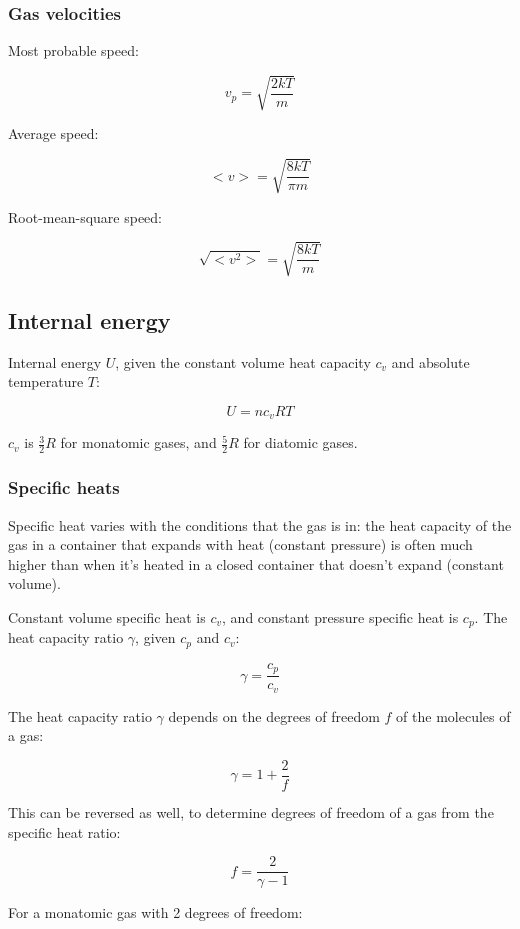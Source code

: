 \documentclass[12pt]{article}
\begin{document}
\subsubsection{Gas velocities}

Most probable speed:

\[
\boxed{
v_p = \sqrt{\frac{2kT}{m}}
}
\]

Average speed:

\[
\boxed{
< v > = \sqrt{\frac{8kT}{\pi m}}
}
\]

Root-mean-square speed:

\[
\boxed{
\sqrt{< v^2 >} = \sqrt{\frac{8kT}{m}}
}
\]

\subsection{Internal energy}

Internal energy $U$, given the constant volume heat capacity $c_v$ and absolute temperature $T$:

\[
\boxed{
U = n c_v R T
}
\]

$c_v$ is $\frac{3}{2} R$ for monatomic gases, and $\frac{5}{2} R$ for diatomic gases.

\newpage

\subsubsection{Specific heats}

Specific heat varies with the conditions that the gas is in: the heat capacity of the gas in  a container that expands with heat (constant pressure) is often much higher than when it's heated in a closed container that doesn't expand (constant volume).

Constant volume specific heat is $c_v$, and constant pressure specific heat is $c_p$.
The heat capacity ratio $\gamma$, given $c_p$ and $c_v$:

\[
\boxed{
\gamma = \frac{c_p}{c_v}
}
\]

The heat capacity ratio $\gamma$ depends on the degrees of freedom $f$ of the molecules of a gas:

\[
\boxed{
\gamma = 1 + \frac{2}{f}
}
\]

This can be reversed as well, to determine degrees of freedom of a gas from the specific heat ratio:

\[
\boxed{
f = \frac{2}{\gamma - 1}
}
\]

For a monatomic gas with 2 degrees of freedom:
\end{document}
